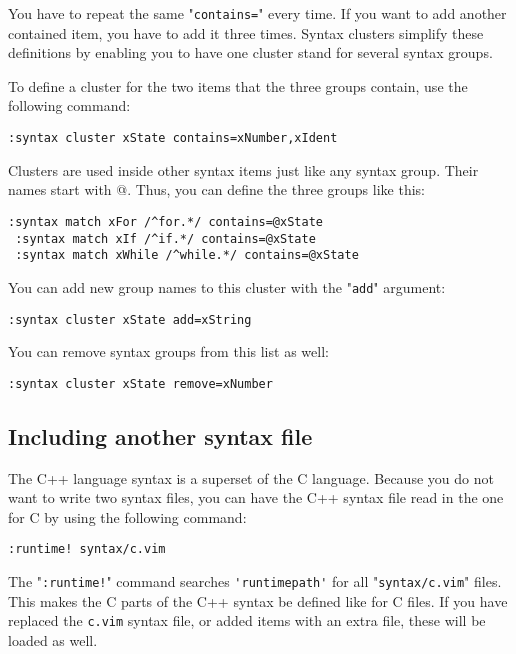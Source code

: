 You have to repeat the same "\verb!contains=!" every time.
If you want to add another contained item, you have to add it three times.
Syntax clusters simplify these definitions by enabling you to have one cluster stand for several syntax groups.

To define a cluster for the two items that the three groups contain, use the following command:

\begin{Verbatim}[samepage=true]
 :syntax cluster xState contains=xNumber,xIdent
\end{Verbatim}

Clusters are used inside other syntax items just like any syntax group.
Their names start with @.
Thus, you can define the three groups like this:

\begin{Verbatim}[samepage=true]
 :syntax match xFor /^for.*/ contains=@xState
 :syntax match xIf /^if.*/ contains=@xState
 :syntax match xWhile /^while.*/ contains=@xState
\end{Verbatim}

You can add new group names to this cluster with the "\verb!add!" argument:

\begin{Verbatim}[samepage=true]
 :syntax cluster xState add=xString
\end{Verbatim}

You can remove syntax groups from this list as well:

\begin{Verbatim}[samepage=true]
 :syntax cluster xState remove=xNumber
\end{Verbatim}

\subsection{Including another syntax file}
The C++ language syntax is a superset of the C language.
Because you do not want to write two syntax files, you can have the C++ syntax file read in the one for C by using the following command:

\begin{Verbatim}[samepage=true]
 :runtime! syntax/c.vim
\end{Verbatim}

The "\verb_:runtime!_" command searches \verb!'runtimepath'! for all "\verb!syntax/c.vim!" files.
This makes the C parts of the C++ syntax be defined like for C files.
If you have replaced the \verb!c.vim! syntax file, or added items with an extra file, these will be loaded as well.

